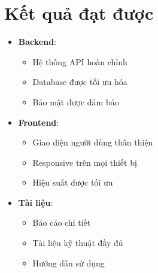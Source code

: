 \documentclass{book}
\let\oldsection\section
\renewcommand{\section}{\clearpage\oldsection}
\begin{document}
\section{Kết quả đạt được}
\begin{itemize}
    \item \textbf{Backend}:
    \begin{itemize}
        \item Hệ thống API hoàn chỉnh
        \item Database được tối ưu hóa
        \item Bảo mật được đảm bảo
    \end{itemize}
    \item \textbf{Frontend}:
    \begin{itemize}
        \item Giao diện người dùng thân thiện
        \item Responsive trên mọi thiết bị
        \item Hiệu suất được tối ưu
    \end{itemize}
    \item \textbf{Tài liệu}:
    \begin{itemize}
        \item Báo cáo chi tiết
        \item Tài liệu kỹ thuật đầy đủ
        \item Hướng dẫn sử dụng
    \end{itemize}
\end{itemize}



   
\end{document}
